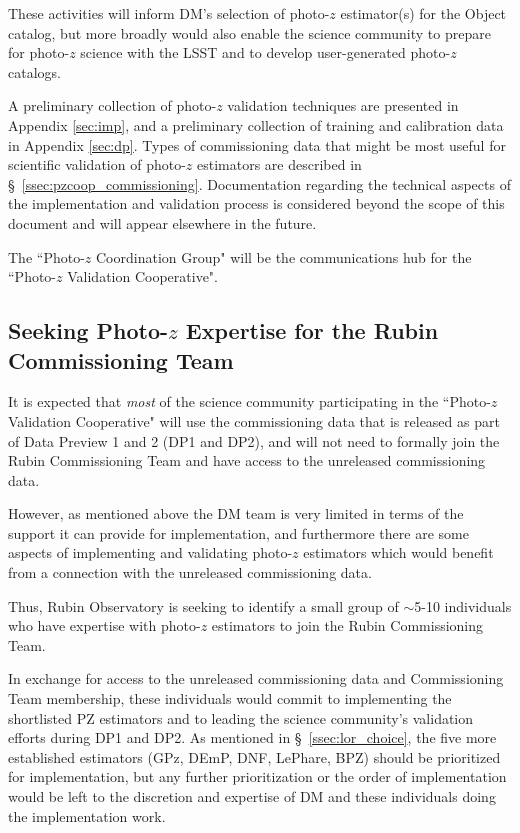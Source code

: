 \documentclass[DM,authoryear,toc]{lsstdoc}
\begin{document}
These activities will inform DM's selection of photo-$z$ estimator(s) for the Object catalog, but more broadly would also enable the science community to prepare for photo-$z$ science with the LSST and to develop user-generated photo-$z$ catalogs.

A preliminary collection of photo-$z$ validation techniques are presented in Appendix \ref{sec:imp}, and a preliminary collection of training and calibration data in Appendix \ref{sec:dp}.
Types of commissioning data that might be most useful for scientific validation of photo-$z$ estimators are described in \S~\ref{ssec:pzcoop_commissioning}.
Documentation regarding the technical aspects of the implementation and validation process is considered beyond the scope of this document and will appear elsewhere in the future.

The ``Photo-$z$ Coordination Group" will be the communications hub for the ``Photo-$z$ Validation Cooperative". 


\subsection{Seeking Photo-$z$ Expertise for the Rubin Commissioning Team}\label{ssec:pzcoop_ct}

It is expected that \textit{most} of the science community participating in the ``Photo-$z$ Validation Cooperative" will use the commissioning data that is released as part of Data Preview 1 and 2 (DP1 and DP2), and will not need to formally join the Rubin Commissioning Team and have access to the unreleased commissioning data.

However, as mentioned above the DM team is very limited in terms of the support it can provide for implementation, and furthermore there are some aspects of implementing and validating photo-$z$ estimators which would benefit from a connection with the unreleased commissioning data.

Thus, Rubin Observatory is seeking to identify a small group of $\sim$5-10 individuals who have expertise with photo-$z$ estimators to join the Rubin Commissioning Team.

In exchange for access to the unreleased commissioning data and Commissioning Team membership, these individuals would commit to implementing the shortlisted PZ estimators and to leading the science community's validation efforts during DP1 and DP2.
As mentioned in \S~\ref{ssec:lor_choice}, the five more established estimators (GPz, DEmP, DNF, LePhare, BPZ) should be prioritized for implementation, but any further prioritization or the order of implementation would be left to the discretion and expertise of DM and these individuals doing the implementation work.
\end{document}
